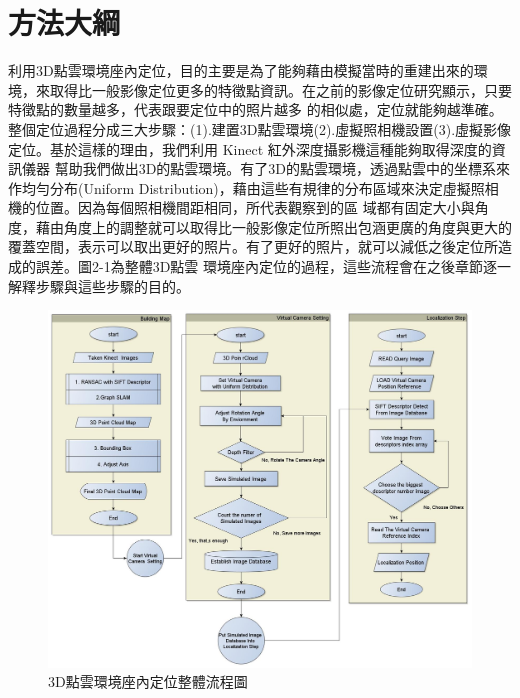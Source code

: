 
%
\section{方法大綱}
  利用3D點雲環境座內定位，目的主要是為了能夠藉由模擬當時的重建出來的環境，來取得比一般影像定位更多的特徵點資訊。在之前的影像定位研究顯示，只要特徵點的數量越多，代表跟要定位中的照片越多
  的相似處，定位就能夠越準確。整個定位過程分成三大步驟：(1).建置3D點雲環境(2).虛擬照相機設置(3).虛擬影像定位。基於這樣的理由，我們利用 Kinect 紅外深度攝影機這種能夠取得深度的資訊儀器
  幫助我們做出3D的點雲環境。有了3D的點雲環境，透過點雲中的坐標系來作均勻分布(Uniform Distribution)，藉由這些有規律的分布區域來決定虛擬照相機的位置。因為每個照相機間距相同，所代表觀察到的區
  域都有固定大小與角度，藉由角度上的調整就可以取得比一般影像定位所照出包涵更廣的角度與更大的覆蓋空間，表示可以取出更好的照片。有了更好的照片，就可以減低之後定位所造成的誤差。圖2-1為整體3D點雲
  環境座內定位的過程，這些流程會在之後章節逐一解釋步驟與這些步驟的目的。
  
\begin{figure}
\begin{center}


  \includegraphics[width=1.1\textwidth]{figures/Enire_System_Process.jpg}
  \caption{3D點雲環境座內定位整體流程圖}
  \label{fig:Enire System Process}

\end{center}
\end{figure}
  
